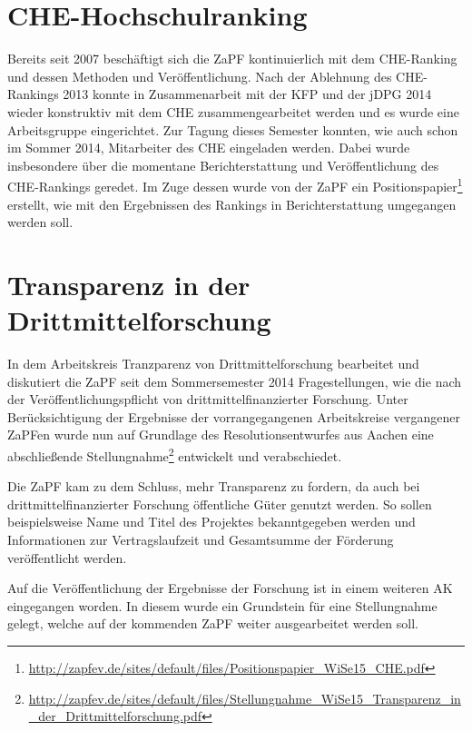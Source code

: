 \section*{CHE-Hochschulranking}
Bereits seit 2007 beschäftigt sich die ZaPF kontinuierlich mit dem CHE-Ranking
und dessen Methoden und Veröffentlichung. Nach der Ablehnung des CHE-Rankings
2013 konnte in Zusammenarbeit mit der KFP und der jDPG 2014 wieder konstruktiv
mit dem CHE zusammengearbeitet werden und es wurde eine Arbeitsgruppe
eingerichtet. Zur Tagung dieses Semester konnten, wie auch schon im Sommer 2014,
Mitarbeiter des CHE eingeladen werden. Dabei wurde insbesondere über die
momentane Berichterstattung und Veröffentlichung des CHE-Rankings geredet. Im
Zuge dessen wurde von der ZaPF ein
Positionspapier\footnote{\href{http://zapfev.de/sites/default/files/Positionspapier\_WiSe15\_CHE.pdf}{\url{http://zapfev.de/sites/default/files/Positionspapier\_WiSe15\_CHE.pdf}}}
erstellt, wie mit den Ergebnissen des Rankings in Berichterstattung umgegangen
werden soll.

\section*{Transparenz in der Drittmittelforschung}
In dem Arbeitskreis \glqq{}Tranzparenz von Drittmittelforschung\grqq{}
bearbeitet und diskutiert die ZaPF seit dem Sommersemester 2014 Fragestellungen,
wie die nach der Veröffentlichungspflicht von drittmittelfinanzierter Forschung.
Unter Berücksichtigung der Ergebnisse der vorrangegangenen Arbeitskreise
vergangener ZaPFen wurde nun auf Grundlage des Resolutionsentwurfes aus Aachen
eine abschließende
Stellungnahme\footnote{\href{http://zapfev.de/sites/default/files/Stellungnahme\_WiSe15\_Transparenz\_in\_der\_Drittmittelforschung.pdf}{\url{http://zapfev.de/sites/default/files/Stellungnahme\_WiSe15\_Transparenz\_in\_der\_Drittmittelforschung.pdf}}}
entwickelt und verabschiedet.

Die ZaPF kam zu dem Schluss, mehr Transparenz zu fordern, da auch bei
drittmittelfinanzierter Forschung öffentliche Güter genutzt werden. So sollen
beispielsweise Name und Titel des Projektes bekanntgegeben werden und
Informationen zur Vertragslaufzeit und Gesamtsumme der Förderung veröffentlicht
werden.

Auf die Veröffentlichung der Ergebnisse der Forschung ist in einem weiteren AK
eingegangen worden. In diesem wurde ein Grundstein für eine Stellungnahme
gelegt, welche auf der kommenden ZaPF weiter ausgearbeitet werden soll.

